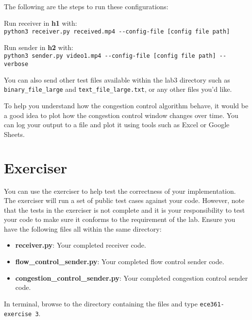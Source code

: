 \documentclass[11pt]{article}
\def\thelab{3}
\begin{document}
The following are the steps to run these configurations:

\noindent Run receiver in \textbf{h1} with:\\
\texttt{python3 receiver.py received.mp4 -{}-config-file [config file path]}

\noindent Run sender in \textbf{h2} with:\\
\texttt{python3 sender.py video1.mp4 -{}-config-file [config file path] -{}-verbose}

\noindent You can also send other test files available within the lab3 directory such as \texttt{binary\_file\_large} and \texttt{text\_file\_large.txt}, or any other files you'd like.


To help you understand how the congestion control algorithm behave, it would be a good idea to plot how the congestion control window changes over time. You can log your output to a file and plot it using tools such as Excel or Google Sheets.

\section{Exerciser}
\label{sec:exercise}
You can use the exerciser to help test the correctness of your implementation. The exerciser will run a set of public test cases against your code. However, note that the tests in the exerciser is not complete and it is your responsibility to test your code to make sure it conforms to the requirement of the lab.
Ensure you have the following files all within the same directory:
\begin{itemize}
    \item \textbf{receiver.py}: Your completed receiver code.
    \item \textbf{flow\_control\_sender.py}: Your completed flow control sender code.
    \item \textbf{congestion\_control\_sender.py}: Your completed congestion control sender code.

\end{itemize}

In terminal, browse to the directory containing the files and type \texttt{ece361-exercise \thelab}.
\end{document}
